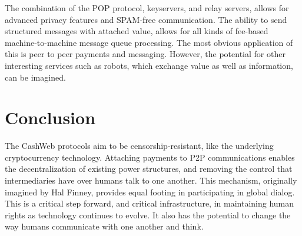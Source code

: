 \documentclass{article}
\begin{document}
The combination of the POP protocol, keyservers, and relay servers, allows for advanced privacy features and SPAM-free communication. The ability to send structured messages with attached value, allows for all kinds of fee-based machine-to-machine message queue processing. The most obvious application of this is peer to peer payments and messaging. However, the potential for other interesting services such as robots, which exchange value as well as information, can be imagined.

\section{Conclusion}

The CashWeb protocols aim to be censorship-resistant, like the underlying cryptocurrency technology. Attaching payments to P2P communications enables the decentralization of existing power structures, and removing the control that intermediaries have over humans talk to one another. This mechanism, originally imagined by Hal Finney\cite{finney2004rpow}, provides equal footing in participating in global dialog. This is a critical step forward, and critical infrastructure, in maintaining human rights as technology continues to evolve. It also has the potential to change the way humans communicate with one another and think.

\cite{nakamoto2008bpp}




\end{document}
